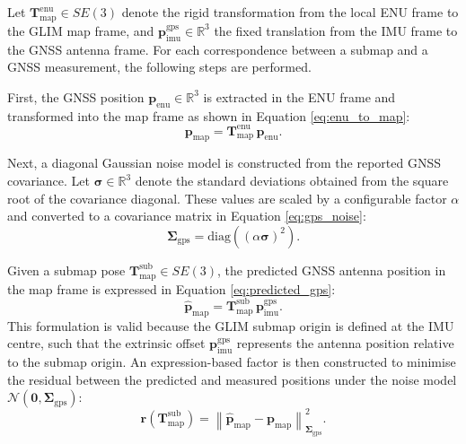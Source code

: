 Let $\mathbf{T}_{\text{map}}^{\text{enu}} \in SE(3)$ denote the rigid transformation from the local ENU frame to the GLIM map frame, and $\mathbf{p}_{\text{imu}}^{\text{gps}} \in \mathbb{R}^3$ the fixed translation from the IMU frame to the GNSS antenna frame. For each correspondence between a submap and a GNSS measurement, the following steps are performed.

First, the GNSS position $\mathbf{p}_{\text{enu}} \in \mathbb{R}^3$ is extracted in the ENU frame and transformed into the map frame as shown in Equation \eqref{eq:enu_to_map}:
\begin{equation}
\label{eq:enu_to_map}
\mathbf{p}_{\text{map}} = \mathbf{T}_{\text{map}}^{\text{enu}} \, \mathbf{p}_{\text{enu}}.
\end{equation}

Next, a diagonal Gaussian noise model is constructed from the reported GNSS covariance. Let $\boldsymbol{\sigma} \in \mathbb{R}^3$ denote the standard deviations obtained from the square root of the covariance diagonal. These values are scaled by a configurable factor $\alpha$ and converted to a covariance matrix in Equation \eqref{eq:gps_noise}:
\begin{equation}
\label{eq:gps_noise}
\boldsymbol{\Sigma}_{\text{gps}} = \mathrm{diag}\!\left((\alpha \boldsymbol{\sigma})^2\right).
\end{equation}

Given a submap pose $\mathbf{T}_{\text{map}}^{\text{sub}} \in SE(3)$, the predicted GNSS antenna position in the map frame is expressed in Equation \eqref{eq:predicted_gps}:
\begin{equation}
\label{eq:predicted_gps}
\hat{\mathbf{p}}_{\text{map}} = \mathbf{T}_{\text{map}}^{\text{sub}} \, \mathbf{p}_{\text{imu}}^{\text{gps}}.
\end{equation}
This formulation is valid because the GLIM submap origin is defined at the IMU centre, such that the extrinsic offset $\mathbf{p}_{\text{imu}}^{\text{gps}}$ represents the antenna position relative to the submap origin. An expression-based factor is then constructed to minimise the residual between the predicted and measured positions under the noise model $\mathcal{N}(\mathbf{0}, \boldsymbol{\Sigma}_{\text{gps}})$:
\begin{equation}
\label{eq:gnss_factor}
\mathbf{r}(\mathbf{T}_{\text{map}}^{\text{sub}}) = \left\| \hat{\mathbf{p}}_{\text{map}} - \mathbf{p}_{\text{map}} \right\|^2_{\boldsymbol{\Sigma}_{\text{gps}}}.
\end{equation}


